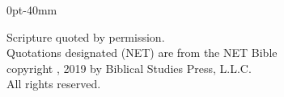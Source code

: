 \documentclass[paper=179mm:239mm,pagesize=auto,12pt,headinclude=on,openany,oneside]{scrbook}
\newcommand{\netnotesbodyfontsize}{\fontsize{11.4pt}{14pt}\selectfont}
\begin{document}
\netnotesbodyfontsize

\begin{adjustwidth}{0pt}{-40mm}



\end{adjustwidth}
\clearpage




\vfill
\begin{center}
\small
Scripture quoted by permission.\\
Quotations designated (NET) are from the NET Bible\textregistered\\
copyright , 2019 by Biblical Studies Press, L.L.C.\\
All rights reserved.
\end{center}
\end{document}
